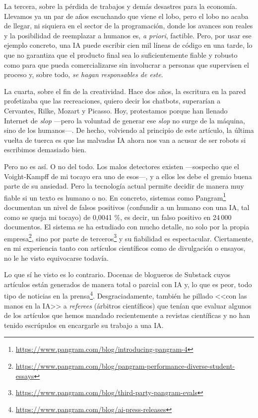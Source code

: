 \documentclass[11pt,a4paper]{article}
\begin{document}
La tercera, sobre la pérdida de trabajos y demás desastres para la economía. Llevamos ya un par de años escuchando que viene el lobo, pero el lobo no acaba de llegar, ni siquiera en el sector de la programación, donde los avances son reales y la posibilidad de reemplazar a humanos es, \emph{a priori}, factible. Pero, por usar ese ejemplo concreto, una IA puede escribir cien mil líneas de código en una tarde, lo que no garantiza que el producto final sea lo suficientemente fiable y robusto como para que pueda comercializarse sin involucrar a personas que supervisen el proceso y, sobre todo, \emph{se hagan responsables de este}.

La cuarta, sobre el fin de la creatividad. Hace dos años, la escritura en la pared profetizaba que las recreaciones, quiero decir los chatbots, superarían a Cervantes, Rilke, Mozart y Picasso. Hoy, protestamos porque han llenado Internet de \emph{slop} ---pero la voluntad de generar ese \emph{slop} no surge de la máquina, sino de los humanos---. De hecho, volviendo al principio de este artículo, la última vuelta de tuerca es que las malvadas IA ahora nos van a acusar de ser robots si escribimos demasiado bien. 

Pero no es así. O no del todo. Los malos detectores existen ---sospecho que el Voight-Kampff de mi tocayo era uno de esos---, y a ellos les debe el gremio buena parte de su ansiedad. Pero la tecnología actual permite decidir de manera muy fiable si un texto es humano o no. En concreto, sistemas como Pangram\footnote{\url{https://www.pangram.com/blog/introducing-pangram-4}} documentan un nivel de falsos positivos (confundir a un humano con una IA, tal como se queja mi tocayo) de 0,0041 \%, es decir, un falso positivo en 24\,000 documentos. El sistema se ha estudiado con mucho detalle, no solo por la propia empresa\footnote{\url{https://www.pangram.com/blog/pangram-performance-diverse-student-essays}}, sino por parte de terceros\footnote{\url{https://www.pangram.com/blog/third-party-pangram-evals}} y su fiabilidad es espectacular. Ciertamente, en mi experiencia tanto con artículos científicos como de divulgación o ensayos, no le he visto equivocarse todavía.

Lo que sí he visto es lo contrario. Docenas de blogueros de Substack cuyos artículos están generados de manera total o parcial con IA y, lo que es peor, todo tipo de noticias en la prensa\footnote{\url{https://www.pangram.com/blog/ai-press-releases}}. Desgraciadamente, también he pillado <<con las manos en la IA>> a \emph{referees} (árbitros científicos) que tenían que evaluar algunos de los artículos que hemos mandado recientemente a revistas científicas y no han tenido escrúpulos en encargarle su trabajo a una IA. 
\end{document}
